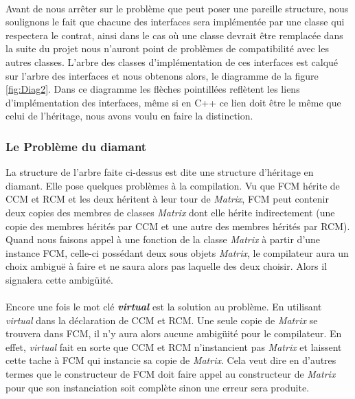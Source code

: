 \documentclass[a4paper, 10pt]{report}
\begin{document}
\paragraph*{}
Avant de nous arrêter sur le problème que peut poser une pareille structure, nous soulignons le fait que chacune 
des interfaces sera implémentée par une classe qui respectera le contrat, ainsi dans le cas où une classe devrait être remplacée 
dans la suite du projet nous n'auront point de problèmes de compatibilité avec les autres classes.
L’arbre des classes d’implémentation de ces interfaces est calqué sur l’arbre des interfaces et nous obtenons alors, 
le diagramme de la figure \ref{fig:Diag2}.\newline
Dans ce diagramme les flèches pointillées reflètent les liens d’implémentation des interfaces, même si en C++ ce lien 
doit être le même que celui de l’héritage, nous avons voulu en faire la distinction.

\subsubsection{Le Problème du diamant}
La structure de l’arbre faite ci-dessus est dite une structure d’héritage en diamant. Elle pose quelques problèmes à la 
compilation.\newline
Vu que FCM hérite de CCM et RCM et les deux héritent à leur tour de \textit{Matrix}, FCM peut contenir deux copies des membres 
de classes \textit{Matrix} dont elle hérite indirectement (une copie des membres hérités par CCM et une autre des membres 
hérités par RCM). Quand nous faisons appel à une fonction de la classe \textit{Matrix} à partir d’une instance FCM, 
celle-ci possédant deux sous objets \textit{Matrix}, le compilateur aura un choix ambiguë à faire et ne saura alors pas
laquelle des deux choisir. Alors il signalera cette ambigüité.
\paragraph*{}
Encore une fois le mot clé \textbf{\textit{virtual}} est la solution au problème.  En utilisant \textit{virtual} dans la  
déclaration de CCM et RCM. Une seule copie de \textit{Matrix} se trouvera dans FCM, il n'y aura alors aucune ambigüité pour 
le compilateur.\newline
En effet, \textit{virtual} fait en sorte que CCM et RCM n’instancient pas \textit{Matrix} et laissent cette tache à FCM 
qui instancie sa copie de \textit{Matrix}. Cela veut dire en d’autres termes que le constructeur de FCM doit faire appel 
au constructeur de \textit{Matrix} pour que son instanciation soit complète sinon une erreur sera produite.
\end{document}
